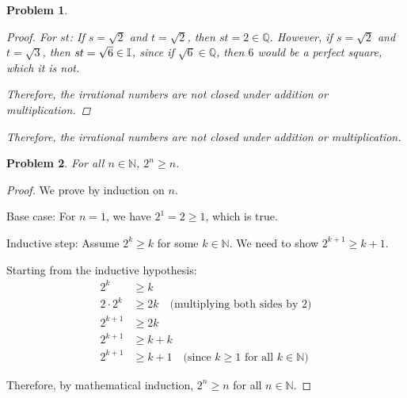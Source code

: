 \documentclass[12pt]{article}
\newtheorem{problem}{Problem}
\newcommand{\QQ}{\ensuremath{\mathbb Q}}
\newcommand{\NN}{\ensuremath{\mathbb N}}
\begin{document}
\begin{problem}
\begin{enumerate}[(a)]
\begin{proof}
For $st$: If $s = \sqrt{2}$ and $t = \sqrt{2}$, then $st = 2 \in \QQ$. However, if $s = \sqrt{2}$ and $t = \sqrt{3}$, then $st = \sqrt{6} \in \mathbb{I}$, since if $\sqrt{6} \in \QQ$, then $6$ would be a perfect square, which it is not.

Therefore, the irrational numbers are not closed under addition or multiplication.
\end{proof}
Therefore, the irrational numbers are not closed under addition or multiplication.
\end{enumerate}
\end{problem}


\begin{problem} %
For all $n\in\NN$, $2^n \ge n$.
\end{problem}

\begin{proof}
	We prove by induction on $n$.

Base case: For $n = 1$, we have $2^1 = 2 \ge 1$, which is true.

Inductive step: Assume $2^k \ge k$ for some $k \in \NN$. We need to show $2^{k+1} \ge k + 1$.

Starting from the inductive hypothesis:
\begin{align*}
2^k &\ge k \\
2 \cdot 2^k &\ge 2k \quad \text{(multiplying both sides by 2)} \\
2^{k+1} &\ge 2k \\
2^{k+1} &\ge k + k \\
2^{k+1} &\ge k + 1 \quad \text{(since $k \ge 1$ for all $k \in \NN$)}
\end{align*}

Therefore, by mathematical induction, $2^n \ge n$ for all $n \in \NN$.
\end{proof}
\end{document}

